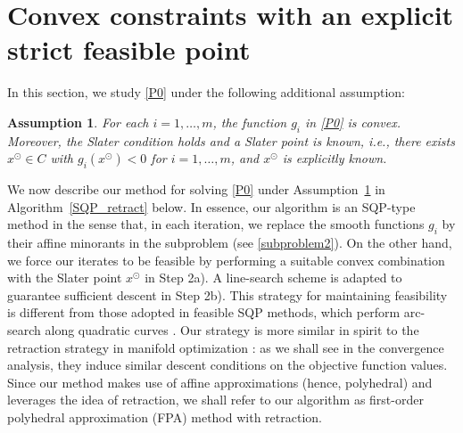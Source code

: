\documentclass[10pt]{article}
\numberwithin{equation}{section}
\newtheorem{assumption}{Assumption}[section]
\def\xfeas{x^\odot}
\begin{document}
\section{Convex constraints with an explicit strict feasible point}\label{sec3}
In this section, we study \eqref{P0} under the following additional assumption:
\begin{assumption}\label{assumption1}
For each $i = 1, \ldots, m$, the function $g_i$ in \eqref{P0} is convex. Moreover, {\color{blue} the Slater condition holds and a Slater point is known, i.e., there exists $\xfeas\in C$ with $g_i(\xfeas) < 0$ for $i = 1, \ldots, m$, and $\xfeas$ is explicitly known. }
\end{assumption}
We now describe our method for solving \eqref{P0} under Assumption~\ref{assumption1} in Algorithm~\ref{SQP_retract} below. In essence, our algorithm is an SQP-type method in the sense that, in each iteration, we replace the smooth functions $g_i$ by their affine minorants in the subproblem (see \eqref{subproblem2}). On the other hand, we force our iterates to be feasible by performing a suitable convex combination with the Slater point $\xfeas$ in Step 2a). A line-search scheme is adapted to guarantee sufficient descent in Step 2b). This strategy for maintaining feasibility is different from those adopted in feasible SQP methods, which perform arc-search along quadratic curves \cite{PaTi93,FlPa08}. Our strategy is more similar in spirit to the retraction strategy in manifold optimization \cite{ChenMA20,ChenZM19}: as we shall see in the convergence analysis, they induce similar descent conditions on the objective function values. Since our method makes use of affine approximations (hence, polyhedral) and leverages the idea of retraction, we shall refer to our algorithm as first-order polyhedral approximation (FPA) method with retraction.
\end{document}
